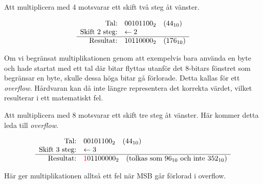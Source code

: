 \documentclass[
  swedish,
  letterpaper,
  oneside,
  openany]{book}
\begin{document}
\begin{tcolorbox}[enhanced jigsaw, arc=.35mm, bottomrule=.15mm, bottomtitle=1mm, breakable, colback=white, colbacktitle=quarto-callout-note-color!10!white, colframe=quarto-callout-note-color-frame, coltitle=black, left=2mm, leftrule=.75mm, opacityback=0, opacitybacktitle=0.6, rightrule=.15mm, title=\textcolor{quarto-callout-note-color}{\faInfo}\hspace{0.5em}{Exempel: Multiplikation med 4 (\(2^2\))}, titlerule=0mm, toprule=.15mm, toptitle=1mm]

Att multiplicera med 4 motsvarar ett skift två steg åt vänster.

\[
\begin{array}{r@{\quad}l}
  \text{Tal:} & 00101100_2 \quad (44_{10}) \\
  \text{Skift 2 steg:} & \leftarrow 2 \\
  \hline
  \text{Resultat:} & 10110000_2 \quad (176_{10})
\end{array}
\]

\end{tcolorbox}

Om vi begränsat multiplikationen genom att exempelvis bara använda en
byte och hade startat med ett tal där bitar flyttas utanför det 8-bitars
fönstret som begränsar en byte, skulle dessa höga bitar gå förlorade.
Detta kallas för ett \emph{overflow}. Hårdvaran kan då inte längre
representera det korrekta värdet, vilket resulterar i ett matematiskt
fel.

\begin{tcolorbox}[enhanced jigsaw, arc=.35mm, bottomrule=.15mm, bottomtitle=1mm, breakable, colback=white, colbacktitle=quarto-callout-note-color!10!white, colframe=quarto-callout-note-color-frame, coltitle=black, left=2mm, leftrule=.75mm, opacityback=0, opacitybacktitle=0.6, rightrule=.15mm, title=\textcolor{quarto-callout-note-color}{\faInfo}\hspace{0.5em}{Exempel: Multiplikation med 8 (\(2^3\)) och overflow}, titlerule=0mm, toprule=.15mm, toptitle=1mm]

Att multiplicera med 8 motsvarar ett skift tre steg åt vänster. Här
kommer detta leda till \emph{overflow}.

\[
\begin{array}{r@{\quad}l}
  \text{Tal:} & 00101100_2 \quad (44_{10}) \\
  \text{Skift 3 steg:} & \leftarrow 3 \\
  \hline
  \text{Resultat:} & \textcolor{red}{1}\textcolor{black}{01100000}_2 \quad (\text{tolkas som } 96_{10} \text{ och inte } 352_{10})
\end{array}
\]

Här ger multiplikationen alltså ett fel när MSB går förlorad i overflow.

\end{tcolorbox}
\end{document}
